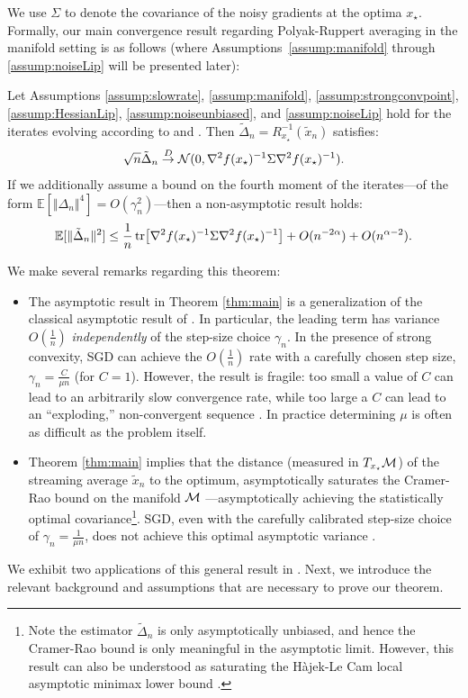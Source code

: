 We use $\Sigma$ to denote the covariance of the noisy gradients at the optima $x_\star$.
Formally, our main convergence result regarding Polyak-Ruppert averaging in the manifold setting is as follows (where Assumptions~\ref{assump:manifold} through \ref{assump:noiseLip} will be presented later):
\begin{theorem} \label{thm:main}
  Let Assumptions \ref{assump:slowrate}, \ref{assump:manifold}, \ref{assump:strongconvpoint},
  \ref{assump:HessianLip}, \ref{assump:noiseunbiased},
  and  \ref{assump:noiseLip}
  hold for the iterates evolving according to  and .
    Then $\tilde{\Delta}_n = R_{x_{\star}}^{-1}(\tilde{x}_n)$ satisfies:
  \begin{align}
   \sqrt{n} \tilde{\Delta}_n \overset{D}{\to} \mathcal{N}(0, \nabla^2 f(x_\star)^{-1} \Sigma \nabla^2 f(x_\star)^{-1}). \notag
  \end{align}
  If we additionally assume a bound on the fourth moment of the iterates---of the form $\mathbb{E}[\Vert \Delta_n \Vert^4] = O(\gamma_n^2)$---then a
  non-asymptotic result holds:
  \begin{align}
    \mathbb{E}[\Vert \tilde{\Delta}_n \Vert^2] \leq \frac{1}{n} \tr[\nabla^2 f(x_\star)^{-1} \Sigma \nabla^2 f(x_\star)^{-1}] + O(n^{-2\alpha}) + O(n^{\alpha-2}). \notag
  \end{align}
  \end{theorem}
We make several remarks regarding this theorem:
\begin{itemize}
\vspace*{-6pt}
  \item The asymptotic result in Theorem \ref{thm:main} is a generalization of the classical asymptotic result of \citet{polyak1992acceleration}. In particular, the leading term has variance $O(\frac{1}{n})$ \textit{independently} of the step-size choice $\gamma_n$. In the presence of strong convexity, SGD can achieve the $O(\frac{1}{n})$ rate with a carefully chosen step size, $\gamma_n = \frac{C}{\mu n}$ (for $C=1$). However, the result is fragile: too small a value of $C$ can lead to an arbitrarily slow convergence rate, while too large a $C$ can lead to an ``exploding,'' non-convergent sequence \citep{NemJudLan08}. In practice determining $\mu$ is often as difficult as the problem itself.
 \vspace*{-6pt}
 \item Theorem \ref{thm:main} implies that the distance  (measured in $T_{x_\star} \mathcal{M}$) of the streaming average $\tilde{x}_n$ to the optimum,
  asymptotically saturates the Cramer-Rao bound on the manifold $\mathcal{M}$ \citep{smi05, Bou13}---asymptotically achieving the statistically optimal covariance\footnote{Note the estimator $\tilde{\Delta}_n$ is only asymptotically unbiased, and hence the Cramer-Rao bound is only meaningful in the asymptotic limit. However, this result can also be understood as saturating the H\`{a}jek-Le Cam local asymptotic minimax lower bound \citep[Ch. 8]{van1998asymptotic}.}. SGD, even with the carefully calibrated step-size choice of $\gamma_n = \frac{1}{\mu n}$, does not achieve this optimal asymptotic variance \citep{NevHas73}.
  \vspace*{-6pt}
\end{itemize}
We exhibit two applications of this general result in . Next, we introduce the relevant background and assumptions that are necessary to prove our theorem.
